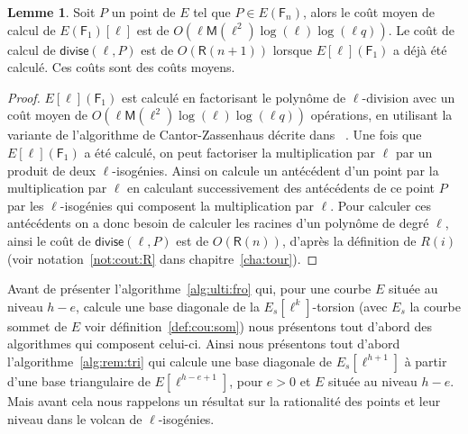 \documentclass[10pt,a4paper]{book}
\theoremstyle{plain}
\theoremstyle{definition}
\theoremstyle{definition}
\newtheorem{lem}[thm]{Lemme}
\theoremstyle{definition}
\theoremstyle{definition}
\newtheorem{prop}[thm]{Proposition}
\theoremstyle{definition}
\theoremstyle{remark}
\theoremstyle{remark}
\theoremstyle{definition}
\begin{document}
\begin{lem}
\label{lem:div:cou}
Soit $P$ un point de $E$ tel que $P \in E(\mathsf{F}_{n})$, alors le coût moyen
de calcul de $E(\mathsf{F}_1)[\ell]$ est de $O(\ell \mathsf{M}(\ell^2)
\log(\ell)\log(\ell q))$. Le coût de calcul de $\mathsf{divise}(\ell,P)$ est de
$O(\mathsf{R}(n+1))$ lorsque $E[\ell](\mathsf{F}_1)$ a déjà été calculé. Ces 
coûts sont des coûts moyens.
\end{lem}

\begin{proof}
$E[\ell](\mathsf{F}_1)$ est calculé en factorisant le polynôme de 
$\ell$-division 
avec un coût moyen de $O(\ell \mathsf{M}(\ell^2)\log(\ell)\log(\ell q))$
opérations, en utilisant la variante de l'algorithme de Cantor-Zassenhaus 
décrite dans ~\cite[Chapter~14.5]{vzGJG03}.
 Une fois que $E[\ell](\mathsf{F}_1)$ a été calculé, on peut factoriser la
 multiplication par $\ell$ par un produit de deux $\ell$-isogénies. Ainsi on
 calcule un antécédent d'un point par la multiplication par $\ell$ en 
 calculant successivement des antécédents de ce point $P$ par les 
 $\ell$-isogénies qui composent la multiplication par $\ell$. Pour calculer 
 ces antécédents on a donc besoin de calculer les racines d'un polynôme de 
 degré $\ell$, ainsi le coût de $\mathsf{divise}(\ell,P)$ est de 
 $O(\mathsf{R}(n))$, d'après la définition de $R(i)$  (voir notation~\ref{not:cout:R} 
 dans chapitre~\ref{cha:tour}).  
\end{proof}


Avant de présenter l'algorithme~\ref{alg:ulti:fro} qui, pour une courbe $E$ 
située au niveau $h-e$, calcule une base diagonale de la $E_s[\ell^k]$-torsion 
(avec $E_s$ la courbe sommet de $E$ voir définition~\ref{def:cou:som}) nous 
présentons tout d'abord des algorithmes qui composent celui-ci.
Ainsi nous présentons tout d'abord l'algorithme~\ref{alg:rem:tri} qui calcule
une base diagonale de $E_s[\ell^{h+1}]$ à partir d'une base triangulaire de 
$E[\ell^{h-e+1}]$, pour $e>0$ et $E$ située au niveau $h-e$. Mais avant cela 
nous rappelons un résultat sur la rationalité des points et leur niveau dans le
volcan de $\ell$-isogénies.
%
\end{document}
